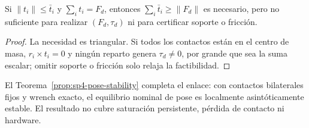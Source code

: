 \begin{proposicion}
\label{prop:pre-sp2-scalar-insufficiency}
Si $\|t_i\|\leq\bar t_i$ y $\sum_i t_i=F_d$, entonces
$\sum_i\bar t_i\geq\|F_d\|$ es necesario, pero no suficiente para realizar
$(F_d,\tau_d)$ ni para certificar soporte o fricción.
\end{proposicion}
\begin{proof}
La necesidad es triangular. Si todos los contactos están en el centro de masa,
$r_i\times t_i=0$ y ningún reparto genera $\tau_d\ne0$, por grande que sea la
suma escalar; omitir soporte o fricción solo relaja la factibilidad.
\end{proof}

El Teorema~\ref{prop:sp4-pose-stability} completa el enlace: con contactos
bilaterales fijos y wrench exacto, el equilibrio nominal de pose es localmente
asintóticamente estable. El resultado no cubre saturación persistente, pérdida
de contacto ni hardware.
